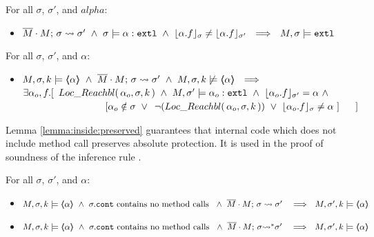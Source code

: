  {
 \begin{lemma} For all $\sigma$, $\sigma'$, and $alpha$:
\begin{itemize}
\item
$\leadstoBounded  {\Mtwo\cdot M}  {\sigma}  {\sigma'}\ \wedge \  \sigma \models \external{\alpha} \ \wedge\  {\interpret{\sigma} {\alpha.f}} \neq {\interpret{\sigma'} {\alpha.f}}
 \ \ \Longrightarrow\ \  M,\sigma \models \extThis$
\end{itemize}
\end{lemma}
  } 
    
  
 
   {
 \begin{lemma} For all $\sigma$, $\sigma'$, and $\alpha$:
 \label{lemma:notInside:implies}
\begin{itemize}
\item
$ \satDAssertFrom M  {\sigma} k   {\inside{\alpha}}  \ \wedge \ \leadstoBounded  {\Mtwo\cdot M}  {\sigma}  {\sigma'}\ \wedge \  \notSatDAssertFrom M  {\sigma} k   {\inside{\alpha}}
 \ \ \Longrightarrow\ \ $\\
 $\exists \alpha_o,f.[\  \LRelevantK {\alpha_o} {\sigma} {k} \ \wedge \ M, \sigma' \models \external {\alpha_o} \ \wedge \ \interpret {\sigma'} {\alpha_o.f} = \alpha\  \wedge$\\
$\strut \hspace{3cm} [ \alpha_o \notin \sigma\ \vee\ \NotLRelevantK {\alpha_o} {\sigma} {k}\ \vee\  \interpret {\sigma} {\alpha_o.f} \neq \alpha\ ]\ \ \ \ \ ] $
\end{itemize}
\end{lemma}
}

Lemma \ref{lemma:inside:preserved}  guarantees that internal code which does not include method call preserves absolute protection. 
It is used in the proof of soundness of the inference rule {}.

  {
 \begin{lemma} For all $\sigma$, $\sigma'$, and $\alpha$:
 \label{lemma:inside:preserved} 
\begin{itemize}
\item
$ \satDAssertFrom M  {\sigma} k   {\inside{\alpha}}  \ \wedge \ \sigma.\prg{cont} \mbox{ contains no method calls } \ \wedge\ \leadstoBounded   {\Mtwo\cdot M}  {\sigma}  {\sigma'}\  \ \ \Longrightarrow\ \ \satDAssertFrom M  {\sigma'} k   {\inside{\alpha}}$
\item
$ \satDAssertFrom M  {\sigma} k   {\inside{\alpha}}  \ \wedge \ \sigma.\prg{cont}  \mbox{ contains no method calls } \ \wedge\ \leadstoBoundedStar  {\Mtwo\cdot M}  {\sigma}  {\sigma'}\  \ \ \Longrightarrow\ \ \satDAssertFrom M  {\sigma'} k   {\inside{\alpha}}$
\end{itemize}
\end{lemma}
}

